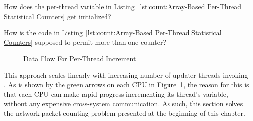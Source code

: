\QuickQuiz{}
	How does the per-thread  variable in
	Listing~\ref{lst:count:Array-Based Per-Thread Statistical Counters}
	get initialized?
 \QuickQuizEnd

\QuickQuiz{}
	How is the code in
	Listing~\ref{lst:count:Array-Based Per-Thread Statistical Counters}
	supposed to permit more than one counter?
 \QuickQuizEnd

\begin{figure}[tb]
\centering
{}
\caption{Data Flow For Per-Thread Increment}
\label{fig:count:Data Flow For Per-Thread Increment}
\end{figure}

This approach scales linearly with increasing number of updater threads
invoking .
As is shown by the green arrows on each CPU in
Figure~\ref{fig:count:Data Flow For Per-Thread Increment},
the reason for this is that each CPU can make rapid progress incrementing
its thread's variable, without any expensive cross-system communication.
As such, this section solves the network-packet counting problem presented
at the beginning of this chapter.

